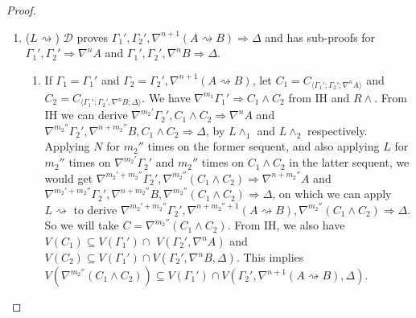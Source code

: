 \documentclass[12pt,a4paper]{article}
\theoremstyle{plain}
\theoremstyle{definition}
\begin{document}
\begin{proof}
\begin{enumerate}
		\item ($L\rightsquigarrow$) $\mathcal{D}$ proves $\Gamma_1' , \Gamma_2' , \nabla^{n+1} (A \rightsquigarrow B) \Rightarrow \Delta$ and has sub-proofs for $\Gamma_1' , \Gamma_2' \Rightarrow \nabla^n A$ and $\Gamma_1' , \Gamma_2' , \nabla^n B \Rightarrow \Delta$.
		\begin{enumerate}
			\item If $\Gamma_1 = \Gamma_1'$ and $\Gamma_2 = \Gamma_2' , \nabla^{n+1} (A \rightsquigarrow B)$, let $C_1 = C_{\langle\Gamma_1';\Gamma_2';\nabla^n A\rangle}$ and $C_2 = C_{\langle\Gamma_1';\Gamma_2',\nabla^n B;\Delta\rangle}$.
			We have $\nabla^{m_1} \Gamma_1' \Rightarrow C_1 \land C_2$ from IH and $R\land$.
			From IH we can derive $\nabla^{m_2'} \Gamma_2' , C_1 \land C_2 \Rightarrow \nabla^n A$ and $\nabla^{m_2''} \Gamma_2' , \nabla^{n+m_2''} B , C_1 \land C_2 \Rightarrow \Delta$, by $L\land_1$ and $L\land_2$ respectively. Applying $N$ for $m_2''$ times on the former sequent, and also applying $L$ for $m_2''$ times on $\nabla^{m_2'} \Gamma_2'$ and $m_2''$ times on $C_1 \wedge C_2$ in the latter sequent, we would get $\nabla^{m_2'+m_2''} \Gamma_2' , \nabla^{m_2''} (C_1 \land C_2) \Rightarrow \nabla^{n+m_2''} A$ and $\nabla^{m_2'+m_2''} \Gamma_2' , \nabla^{n+m_2''} B , \nabla^{m_2''} (C_1 \land C_2) \Rightarrow \Delta$, on which we can apply $L\rightsquigarrow$ to derive $\nabla^{m_2'+m_2''} \Gamma_2' , \nabla^{n+m_2''+1} (A \rightsquigarrow B) , \nabla^{m_2''} (C_1 \land C_2) \Rightarrow \Delta$. So we will take $C = \nabla^{m_2''}(C_1 \wedge C_2)$.
			From IH, we also have $V(C_1) \subseteq V(\Gamma_1') \cap$ $V(\Gamma_2' , \nabla^n A)$ and $V(C_2) \subseteq V(\Gamma_1') \cap V(\Gamma_2' , \nabla^n B , \Delta)$. This implies $V(\nabla^{m_2''}(C_1 \land C_2)‎) \subseteq V(\Gamma_1') \cap V(\Gamma_2' , \nabla^{n+1} (A \rightsquigarrow B) , \Delta)$.


\end{enumerate}
\end{enumerate}
\end{proof}
\end{document}
